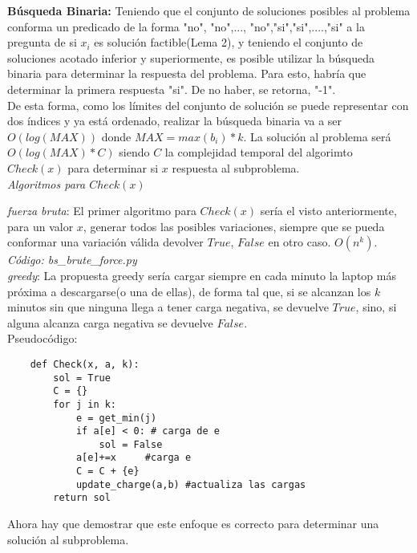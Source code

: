 \documentclass{article}
\begin{document}
\textbf{B\'usqueda Binaria:} Teniendo que el conjunto de soluciones posibles al problema conforma un predicado de la forma "no", "no",..., "no","si","si",....,"si" a la pregunta de si $x_i$ es soluci\'on factible(Lema 2), y teniendo el conjunto de soluciones acotado inferior y superiormente, es posible utilizar la b\'usqueda binaria para determinar la respuesta del problema. Para esto, habr\'ia que determinar la primera respuesta "si". De no haber, se retorna, "-1".\\
De esta forma, como los l\'imites del conjunto de soluci\'on se puede representar con dos \'indices y ya est\'a ordenado,
realizar la b\'usqueda binaria va a ser $O(log(MAX))$ donde $MAX=max(b_i)*k$.
La soluci\'on al problema ser\'a $O(log(MAX)*C)$ siendo $C$ la complejidad temporal del algorimto $Check(x)$ para determinar si $x$ respuesta al subproblema.\\

\textit{Algoritmos para $Check(x)$}
    
\textit{fuerza bruta}: El primer algoritmo para $Check(x)$ ser\'ia el visto anteriormente, para un valor $x$, generar todos las posibles variaciones, siempre que se pueda conformar una variaci\'on v\'alida devolver $True$, $False$ en otro caso. $O(n^k)$.\\
\textit{C\'odigo: bs\_brute\_force.py}\\
    
\textit{greedy}: La propuesta greedy ser\'ia cargar siempre en cada minuto la laptop m\'as pr\'oxima a descargarse(o una de ellas), de forma tal que, si se alcanzan los $k$ minutos sin que ninguna llega a tener carga negativa, se devuelve $True$, sino, si alguna alcanza carga negativa se devuelve $False$. \\
    
    Pseudoc\'odigo:\\
    
\begin{verbatim}
    def Check(x, a, k):
        sol = True
        C = {}
        for j in k:
            e = get_min(j)
            if a[e] < 0: # carga de e
                sol = False
            a[e]+=x     #carga e
            C = C + {e}
            update_charge(a,b) #actualiza las cargas
        return sol    
\end{verbatim}

Ahora hay que demostrar que este enfoque es correcto para determinar una soluci\'on al subproblema.\\
\end{document}
